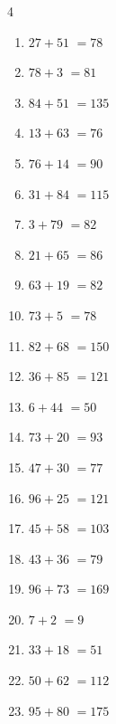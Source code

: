 \begin{multicols}{4}
\begin{enumerate}
  \item $27+51$
        $=78$

\columnbreak %

  \item $78+3$
        $=81$

  \item $84+51$
        $=135$

  \item $13+63$
        $=76$

  \item $76+14$
        $=90$

  \item $31+84$
        $=115$

  \item $3+79$
        $=82$

  \item $21+65$
        $=86$

  \item $63+19$
        $=82$

  \item $73+5$
        $=78$

  \item $82+68$
        $=150$

  \item $36+85$
        $=121$

  \item $6+44$
        $=50$

  \item $73+20$
        $=93$

  \item $47+30$
        $=77$

  \item $96+25$
        $=121$

  \item $45+58$
        $=103$

  \item $43+36$
        $=79$

  \item $96+73$
        $=169$

  \item $7+2$
        $=9$

  \item $33+18$
        $=51$

  \item $50+62$
        $=112$

  \item $95+80$
        $=175$


\end{enumerate}
\end{multicols}
